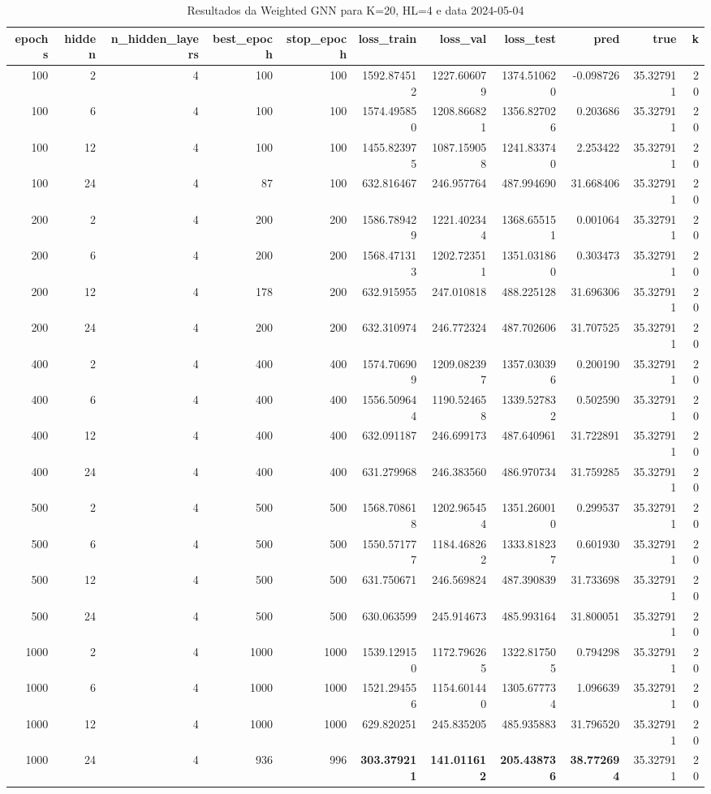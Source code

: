 \begin{table}
\caption{Resultados da Weighted GNN para K=20, HL=4 e data 2024-05-04}
\label{tab:weighted_gnn_results_k20_hl4_d20240504}
\begin{tabular}{rrrrrrrrrrr}
\toprule
epochs & hidden & n\_hidden\_layers & best\_epoch & stop\_epoch & loss\_train & loss\_val & loss\_test & pred & true & k \\
\midrule
100 & 2 & 4 & 100 & 100 & 1592.874512 & 1227.606079 & 1374.510620 & -0.098726 & 35.327911 & 20 \\
100 & 6 & 4 & 100 & 100 & 1574.495850 & 1208.866821 & 1356.827026 & 0.203686 & 35.327911 & 20 \\
100 & 12 & 4 & 100 & 100 & 1455.823975 & 1087.159058 & 1241.833740 & 2.253422 & 35.327911 & 20 \\
100 & 24 & 4 & 87 & 100 & 632.816467 & 246.957764 & 487.994690 & 31.668406 & 35.327911 & 20 \\
200 & 2 & 4 & 200 & 200 & 1586.789429 & 1221.402344 & 1368.655151 & 0.001064 & 35.327911 & 20 \\
200 & 6 & 4 & 200 & 200 & 1568.471313 & 1202.723511 & 1351.031860 & 0.303473 & 35.327911 & 20 \\
200 & 12 & 4 & 178 & 200 & 632.915955 & 247.010818 & 488.225128 & 31.696306 & 35.327911 & 20 \\
200 & 24 & 4 & 200 & 200 & 632.310974 & 246.772324 & 487.702606 & 31.707525 & 35.327911 & 20 \\
400 & 2 & 4 & 400 & 400 & 1574.706909 & 1209.082397 & 1357.030396 & 0.200190 & 35.327911 & 20 \\
400 & 6 & 4 & 400 & 400 & 1556.509644 & 1190.524658 & 1339.527832 & 0.502590 & 35.327911 & 20 \\
400 & 12 & 4 & 400 & 400 & 632.091187 & 246.699173 & 487.640961 & 31.722891 & 35.327911 & 20 \\
400 & 24 & 4 & 400 & 400 & 631.279968 & 246.383560 & 486.970734 & 31.759285 & 35.327911 & 20 \\
500 & 2 & 4 & 500 & 500 & 1568.708618 & 1202.965454 & 1351.260010 & 0.299537 & 35.327911 & 20 \\
500 & 6 & 4 & 500 & 500 & 1550.571777 & 1184.468262 & 1333.818237 & 0.601930 & 35.327911 & 20 \\
500 & 12 & 4 & 500 & 500 & 631.750671 & 246.569824 & 487.390839 & 31.733698 & 35.327911 & 20 \\
500 & 24 & 4 & 500 & 500 & 630.063599 & 245.914673 & 485.993164 & 31.800051 & 35.327911 & 20 \\
1000 & 2 & 4 & 1000 & 1000 & 1539.129150 & 1172.796265 & 1322.817505 & 0.794298 & 35.327911 & 20 \\
1000 & 6 & 4 & 1000 & 1000 & 1521.294556 & 1154.601440 & 1305.677734 & 1.096639 & 35.327911 & 20 \\
1000 & 12 & 4 & 1000 & 1000 & 629.820251 & 245.835205 & 485.935883 & 31.796520 & 35.327911 & 20 \\
1000 & 24 & 4 & 936 & 996 & \textbf{303.379211} & \textbf{141.011612} & \textbf{205.438736} & \textbf{38.772694} & 35.327911 & 20 \\
\bottomrule
\end{tabular}
\end{table}

